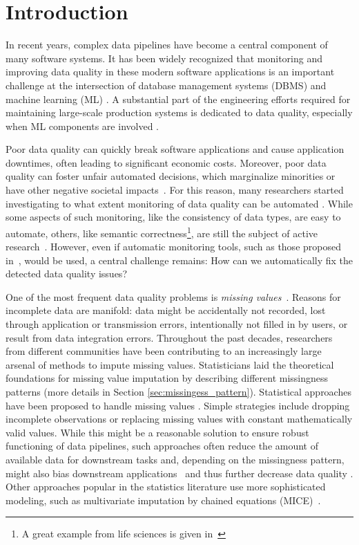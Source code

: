 \section{Introduction}
\label{sec:introduction}

In recent years, complex data pipelines have become a central component of many software systems. It has been widely recognized that monitoring and improving data quality in these modern software applications is an important challenge at the intersection of database management systems (DBMS) and machine learning (ML) \citep{Schelter2015,Abedjan2018}. A substantial part of the engineering efforts required for maintaining large-scale production systems is dedicated to data quality, especially when ML components are involved \citep{Sculley2015,Bose2017b}.

Poor data quality can quickly break software applications and cause application downtimes, often leading to significant economic costs. Moreover, poor data quality can foster unfair automated decisions, which marginalize minorities or have other negative societal impacts~\citep{Stoyanovich2020,Yang2020,Bender2021}. For this reason, many researchers started investigating to what extent monitoring of data quality can be automated \citep{Abedjan2016,Baylor2017,Schelter2018,rukat2020towards}. While some aspects of such monitoring, like the consistency of data types, are easy to automate, others, like semantic correctness\footnote{A great example from life sciences is given in~\citep{Ziemann2016}}, are still the subject of active research~\citep{biessmann2021automated}. However, even if automatic monitoring tools, such as those proposed in~\cite{Schelter2017}, would be used, a central challenge remains: How can we automatically fix the detected data quality issues?

One of the most frequent data quality problems is \emph{missing values}~\citep{Kumar}. Reasons for incomplete data are manifold: data might be accidentally not recorded, lost through application or transmission errors, intentionally not filled in by users, or result from data integration errors.
%
Throughout the past decades, researchers from different communities have been contributing to an increasingly large arsenal of methods to impute missing values. Statisticians laid the theoretical foundations for missing value imputation \citep{Rubin} by describing different missingness patterns (more details in Section \ref{sec:missingess_pattern}). Statistical approaches have been proposed to handle missing values \citep{Graham}. Simple strategies include dropping incomplete observations or replacing missing values with constant mathematically valid values. While this might be a reasonable solution to ensure robust functioning of data pipelines, such approaches often reduce the amount of available data for downstream tasks and, depending on the missingness pattern, might also bias downstream applications~\citep{Stoyanovich2020,Yang2020} and thus further decrease data quality \citep{Little, Graham}. Other approaches popular in the statistics literature use more sophisticated modeling, such as multivariate imputation by chained equations (MICE)~\citep{Little,vanBuuren2018}.

